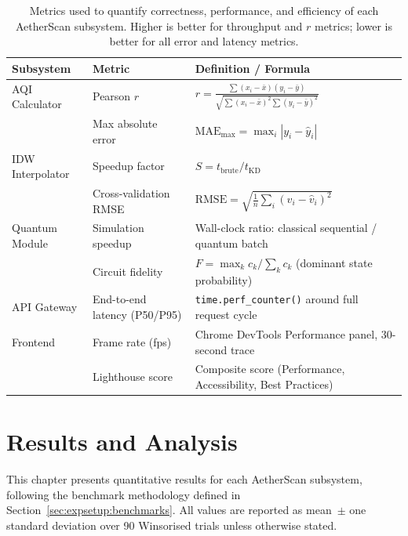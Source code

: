 \documentclass[12pt,a4paper]{article}
\begin{document}
\begin{table}[H]
\centering
\caption[Evaluation metrics by subsystem]{%
Metrics used to quantify correctness, performance, and efficiency of each
AetherScan subsystem. Higher is better for throughput and $r$ metrics;
lower is better for all error and latency metrics.}
\label{tab:metrics}
\begin{tabularx}{\textwidth}{@{}llX@{}}
\toprule
\textbf{Subsystem} & \textbf{Metric} & \textbf{Definition / Formula} \\
\midrule
AQI Calculator &
  Pearson $r$ &
  $r = \frac{\sum(x_i - \bar{x})(y_i - \bar{y})}
             {\sqrt{\sum(x_i-\bar{x})^2 \sum(y_i-\bar{y})^2}}$ \\
& Max absolute error &
  $\text{MAE}_{\max} = \max_i |y_i - \hat{y}_i|$ \\
IDW Interpolator &
  Speedup factor &
  $S = t_{\text{brute}} / t_{\text{KD}}$ \\
& Cross-validation RMSE &
  $\text{RMSE} = \sqrt{\frac{1}{n}\sum_i (v_i - \hat{v}_i)^2}$ \\
Quantum Module &
  Simulation speedup &
  Wall-clock ratio: classical sequential / quantum batch \\
& Circuit fidelity &
  $F = \max_k c_k / \sum_k c_k$ (dominant state probability) \\
API Gateway &
  End-to-end latency (P50/P95) &
  \texttt{time.perf\_counter()} around full request cycle \\
Frontend &
  Frame rate (fps) &
  Chrome DevTools Performance panel, 30-second trace \\
& Lighthouse score &
  Composite score (Performance, Accessibility, Best Practices) \\
\bottomrule
\end{tabularx}
\end{table}

\clearpage
\section{Results and Analysis}
\label{sec:results}

This chapter presents quantitative results for each AetherScan subsystem,
following the benchmark methodology defined in Section~\ref{sec:expsetup:benchmarks}.
All values are reported as mean~$\pm$ one standard deviation over 90
Winsorised trials unless otherwise stated.
\end{document}
